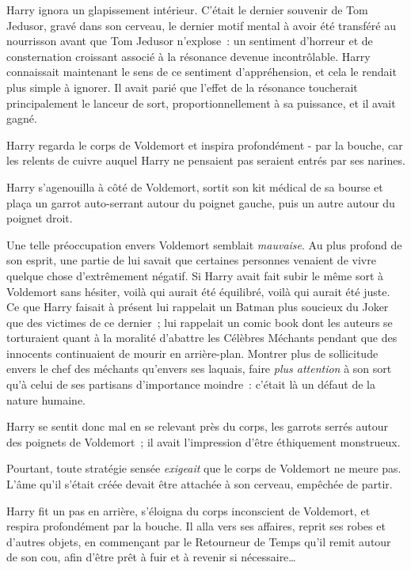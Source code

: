 Harry ignora un glapissement intérieur. C'était le dernier souvenir de Tom Jedusor, gravé dans son cerveau, le dernier motif mental à avoir été transféré au nourrisson avant que Tom Jedusor n'explose~: un sentiment d'horreur et de consternation croissant associé à la résonance devenue incontrôlable. Harry connaissait maintenant le sens de ce sentiment d'appréhension, et cela le rendait plus simple à ignorer. Il avait parié que l'effet de la résonance toucherait principalement le lanceur de sort, proportionnellement à sa puissance, et il avait gagné.

Harry regarda le corps de Voldemort et inspira profondément - par la bouche, car les relents de cuivre auquel Harry ne pensaient pas seraient entrés par ses narines.

Harry s'agenouilla à côté de Voldemort, sortit son kit médical de sa bourse et plaça un garrot auto-serrant autour du poignet gauche, puis un autre autour du poignet droit.

Une telle préoccupation envers Voldemort semblait \emph{mauvaise}. Au plus profond de son esprit, une partie de lui savait que certaines personnes venaient de vivre quelque chose d'extrêmement négatif. Si Harry avait fait subir le même sort à Voldemort sans hésiter, voilà qui aurait été équilibré, voilà qui aurait été juste. Ce que Harry faisait à présent lui rappelait un Batman plus soucieux du Joker que des victimes de ce dernier~; lui rappelait un comic book dont les auteurs se torturaient quant à la moralité d'abattre les Célèbres Méchants pendant que des innocents continuaient de mourir en arrière-plan. Montrer plus de sollicitude envers le chef des méchants qu'envers ses laquais, faire \emph{plus attention} à son sort qu'à celui de ses partisans d'importance moindre~: c'était là un défaut de la nature humaine.

Harry se sentit donc mal en se relevant près du corps, les garrots serrés autour des poignets de Voldemort~; il avait l'impression d'être éthiquement monstrueux.

Pourtant, toute stratégie sensée \emph{exigeait} que le corps de Voldemort ne meure pas. L'âme qu'il s'était créée devait être attachée à son cerveau, empêchée de partir.

Harry fit un pas en arrière, s'éloigna du corps inconscient de Voldemort, et respira profondément par la bouche. Il alla vers ses affaires, reprit ses robes et d'autres objets, en commençant par le Retourneur de Temps qu'il remit autour de son cou, afin d'être prêt à fuir et à revenir si nécessaire…

